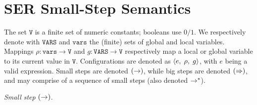 \section{SER Small-Step Semantics}
\label{appendix:ser-semantics}

%
%
The set \(\texttt{V}\) is a finite set of numeric constants; booleans use $0/1$. We respectively denote with \(\texttt{VARS}\) and \(\texttt{vars}\) the (finite) sets of global and local variables. Mappings $\rho:{\texttt{vars}}\to \texttt{V}$ and $g:{\texttt{VARS}}\to \texttt{V}$ respectively map a local or global variable to its current value in \(\texttt{V}\).
%
Configurations are denoted as $\langle e,\; \rho,\; g\rangle$, with \(e\) being a valid \toolname{} expression. 
%
Small steps are denoted $(\mathrel{\rightarrow})$, while big steps are denoted $(\mathrel{\Rightarrow})$, and may comprise of a sequence of small steps (also denoted $\mathrel{\rightarrow}^{*}$).
%
%

\smallskip
\noindent\textit{Small step} $(\mathrel{\rightarrow})$.
	
